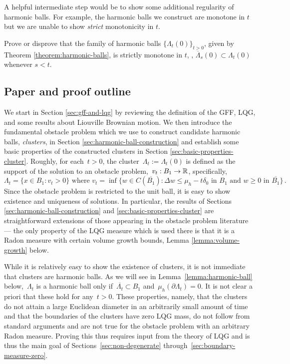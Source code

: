 \documentclass[12pt]{amsart}
\numberwithin{equation}{section}
\begin{document}
	
	
	A helpful intermediate step would be to show some additional regularity of harmonic balls. For example, the harmonic balls
	we construct are monotone in $t$ but we are unable to show {\it strict} monotonicity in $t$. 
	\begin{problem}
		Prove or disprove that the family of harmonic balls $\{\Lambda_t(0)\}_{t>0}$, given by Theorem \ref{theorem:harmonic-balls},  is strictly monotone in $t$, \ie, $\overline{\Lambda}_s(0) \subset \Lambda_t(0)$ whenever $s < t$. 
	\end{problem}
	
	
	
	\subsection{Paper and proof outline}
	
	
	We start in Section \ref{sec:gff-and-lqg} by reviewing the definition of the GFF, LQG, and some results about Liouville Brownian motion.  We then introduce the fundamental obstacle problem  which we use to construct candidate harmonic balls,  {\it clusters}, in Section \ref{sec:harmonic-ball-construction}
	and establish some basic properties of the constructed clusters in Section \ref{sec:basic-properties-cluster}.	Roughly, for each~$t > 0$, the cluster~$\Lambda_t := \Lambda_t(0)$ is defined as the support of the solution to an obstacle problem,~$v_t : B_1 \to \mathbb{R}$, specifically, 
	\[
	\Lambda_t = \{x \in B_1 : v_t > 0 \} \, \, \mbox{where} \, \,  v_t = \inf\{ w \in C(\overline{B_1}) :  \Delta w \leq \mu_h - t \delta_0 \mbox{ in $B_1$}  \mbox{ and }  w \geq  0 \mbox{ in $\overline{B_1}$}\} \, . 
	\]
	Since the obstacle problem is restricted to the unit ball, it is easy to show existence and uniqueness of solutions. In particular, 
	the results of Sections \ref{sec:harmonic-ball-construction} and \ref{sec:basic-properties-cluster} are straightforward extensions of those appearing in the obstacle problem literature --- the only property of the LQG measure which is used there is that it is a Radon measure with certain volume growth bounds, Lemma \ref{lemma:volume-growth} below. 
	
	While it is relatively easy to show the existence of clusters, it is not immediate that clusters are harmonic balls. As we will see in Lemma~\ref{lemma:harmonic-ball}
	below,~$\Lambda_t$ is a harmonic ball only if~$\overline{\Lambda_t} \subset B_1$ and~$\mu_h(\partial \Lambda_t) = 0$. It is not clear a priori that these hold for any~$t > 0$. These properties, namely, that the clusters do not attain a large Euclidean diameter in an arbitrarily small amount of time and that the boundaries of the clusters have zero LQG mass, do not follow from standard arguments and are not true for the obstacle problem with an arbitrary Radon measure.
	Proving this thus requires input from the theory of LQG and is thus the main goal of Sections~\ref{sec:non-degenerate} through~\ref{sec:boundary-measure-zero}.
	
\end{document}

